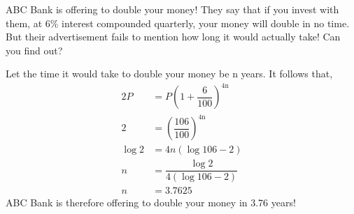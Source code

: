 
%
%
%
%
% 

\question[3] ABC Bank is offering to double your money! They say that if you invest with them, at 6\% interest compounded quarterly, your money will double in no time. But their advertisement fails to mention how long it would actually take! Can you find out?

\ifprintanswers
\fi 

\begin{solution}[\halfpage]
	Let the time it would take to double your money be n years. It follows that,
	\begin{align}
			2P &= P\left(1+\dfrac{6}{100}\right)^\text{4n} \\
		 	 2 &= \left(\dfrac{106}{100}\right)^\text{4n} \\
		\log 2 &= 4n\left(\log 106 -2\right) \\
			 n &= \dfrac{\log 2}{4\left(\log 106 -2\right)} \\
			 n &= 3.7625
	\end{align}
	ABC Bank is therefore offering to double your money in 3.76 years!
\end{solution}
